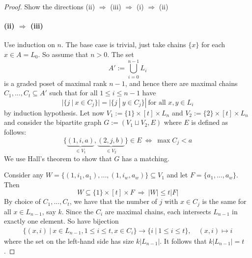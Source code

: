 \documentclass{scrartcl}
\theoremstyle{definition}
\begin{document}
\begin{proof}
    Show the directions (ii) $\Rightarrow$ (iii) $\Rightarrow$ (i) $\Rightarrow$ (ii)
    \paragraph{(ii) $\Rightarrow$ (iii)} Use induction on $n$.
    The base case is trivial, just take chains $\{x\}$ for each $x \in A = L_0$.
    So assume that $n > 0$. The set
    \begin{equation*}
        A' := \bigcup_{i = 0}^{n - 1} L_i
    \end{equation*}
    is a graded poset of maximal rank $n - 1$, and hence there are maximal chains $C_1, ..., C_t \subseteq A'$ such that for all $1 \leq i \leq n - 1$ have
    \begin{equation*}
        |\{j \ | \ x \in C_j\}| = |\{j \ | \ y \in C_j\}| \ \text{for all $x, y \in L_i$}
    \end{equation*}
    by induction hypothesis.
    Let now $V_1 := \{1\} \times [t] \times L_n$ and $V_2 := \{2\} \times [t] \times L_n$ and consider the bipartite graph $G := (V_1 \sqcup V_2, E)$ where $E$ is defined as follows:
    \begin{equation*}
        \{ \underbrace{(1, i, a)}_{\in V_1}, \underbrace{(2, j, b)}_{\in V_2} \} \in E \ \Leftrightarrow \ \max C_j < a
    \end{equation*}
    We use Hall's theorem to show that $G$ has a matching.

    Consider any $W = \{ (1, i_1, a_1), ..., (1, i_w, a_w) \} \subseteq V_1$ and let $F = \{ a_1, ..., a_w \}$.
    Then
    \begin{equation*}
        W \subseteq \{1\} \times [t] \times F \ \Rightarrow \ |W| \leq t|F|
    \end{equation*}
    By choice of $C_1, ..., C_t$, we have that the number of $j$ with $x \in C_j$ is the same for all $x \in L_{n - 1}$, say $k$.
    Since the $C_i$ are maximal chains, each intersects $L_{n - 1}$ in exactly one element.
    So have bijection
    \begin{align*}
        \{ (x, i) \ | \ x \in L_{n - 1}, 1 \leq i \leq t, x \in C_i\} \to \{ i \ | \ 1 \leq i \leq t \}, \quad (x, i) \mapsto i
    \end{align*}
    where the set on the left-hand side has size $k |L_{n - 1}|$. It follows that $k|L_{n - 1}| = t$.


\end{proof}
\end{document}
